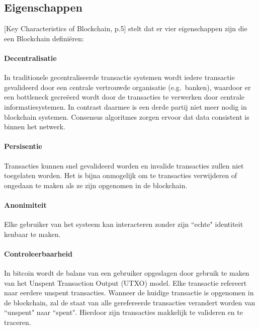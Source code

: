 \clearpage
\subsection{Eigenschappen}

\cite{zheng2017overview}[Key Characteristics of Blockchain, p.5] stelt dat er vier eigenschappen zijn die een Blockchain definiëren:

\paragraph{Decentralisatie} In traditionele gecentraliseerde transactie systemen wordt iedere transactie gevalideerd door een centrale vertrouwde organisatie (e.g.\ banken), waardoor er een bottleneck gecreëerd wordt door de transacties te verwerken door centrale informatiesystemen. In contrast daarmee is een derde partij niet meer nodig in blockchain systemen. Consensus algoritmes zorgen ervoor dat data consistent is binnen het netwerk.

\paragraph{Persisentie} Transacties kunnen snel gevalideerd worden en invalide transacties zullen niet toegelaten worden. Het is bijna onmogelijk om te transacties verwijderen of ongedaan te maken als ze zijn opgenomen in de blockchain.

\paragraph{Anonimiteit} Elke gebruiker van het systeem kan interacteren zonder zijn ``echte" identiteit kenbaar te maken.

\paragraph{Controleerbaarheid} In bitcoin wordt de balans van een gebruiker opgeslagen door gebruik te maken van het Unspent Transaction Output (UTXO) model. Elke transactie refereert naar eerdere unspent transacties. Wanneer de huidige transactie is opgenomen in de blockchain, zal de staat van alle gerefereerde transacties verandert worden van ``unspent" naar ``spent". Hierdoor zijn transacties makkelijk te valideren en te traceren.